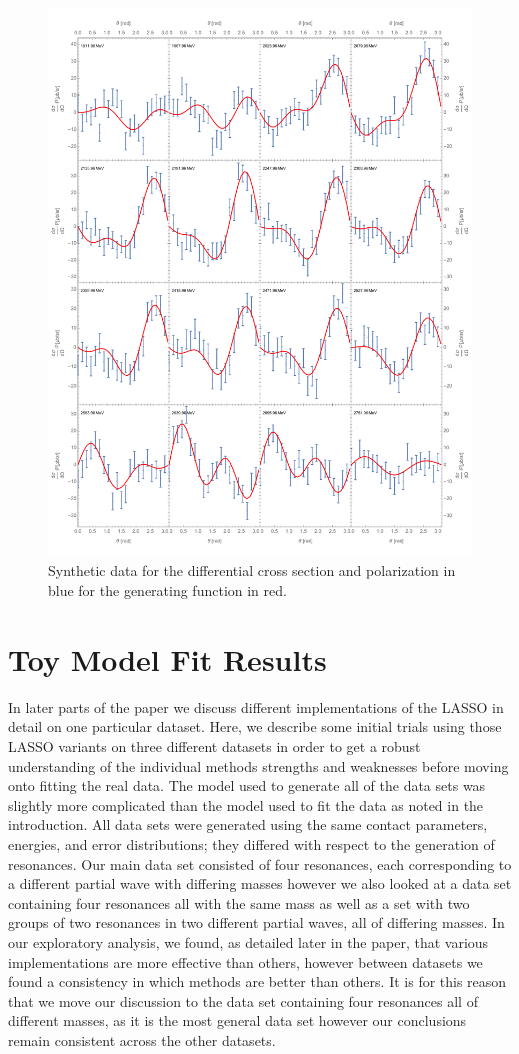 \documentclass[aps, prd, twocolumn, showpacs, superscriptaddress,
preprintnumbers, nofootinbib]{revtex4-1}
\begin{document}
\begin{figure}
\begin{center}
\includegraphics[width=0.49\linewidth,trim=0cm 1cm 1cm 0.5cm]{pol2.pdf}
\end{center}
\caption{Synthetic data for the  differential cross section and polarization in blue for the generating function in red.}
\label{fig:Fig3}
\end{figure}


\newpage
\section{Toy Model Fit Results} \label{sec:Toy Model Fit Results}


In later parts of the paper we discuss different implementations of the LASSO in detail on one particular dataset. Here, we describe some initial trials using those LASSO variants on three different datasets in order to get a robust understanding of the individual methods strengths and weaknesses before moving onto fitting the real data. The model used to generate all of the data sets was slightly more complicated than the model used to fit the data as noted in the introduction. All data sets were generated using the same contact parameters, energies, and error distributions; they differed with respect to the generation of resonances. Our main data set consisted of four resonances, each corresponding to a different partial wave with differing masses however we also looked at a data set containing four resonances all with the same mass as well as a set with two groups of two resonances in two different partial waves, all of differing masses. In our exploratory analysis, we found, as detailed later in the paper, that various implementations are more effective than others, however between datasets we found a consistency in which methods are better than others. It is for this reason that we move our discussion to the data set containing four resonances all of different masses, as it is the most general data set however our conclusions remain consistent across the other datasets. 
\end{document}
